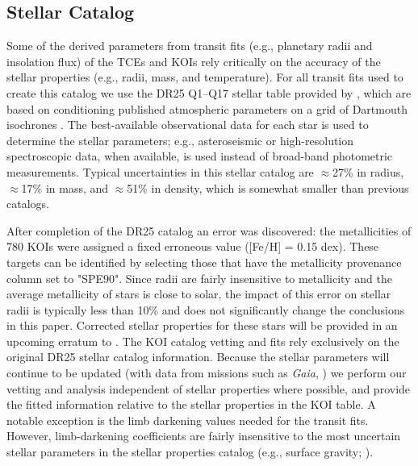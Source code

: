 \subsection{Stellar Catalog}
\label{s:stars}
Some of the derived parameters from transit fits (e.g., planetary radii and insolation flux) of the TCEs and KOIs rely critically on the accuracy of the stellar properties (e.g., radii, mass, and temperature). For all transit fits used to create this catalog we use the DR25 Q1--Q17 stellar table provided by \citet{Mathur2017ApJS}, which are based on conditioning published atmospheric parameters on a grid of Dartmouth isochrones \citep{Dotter2008}. The best-available observational data for each star is used to determine the stellar parameters; e.g., asteroseismic or high-resolution spectroscopic data, when available, is used instead of broad-band photometric measurements. Typical uncertainties in this stellar catalog are $\approx$27\% in radius, $\approx$17\% in mass, and $\approx$51\% in density, which is somewhat smaller than previous catalogs.

{\color{blue}After completion of the DR25 catalog an error was discovered: the metallicities of 780 KOIs were assigned a fixed erroneous value ([Fe/H] = 0.15 dex). These targets can be identified by selecting those that have the metallicity provenance column set to "SPE90". Since radii are fairly insensitive to metallicity and the average metallicity of \Kepler stars is close to solar, the impact of this error on stellar radii is typically less than 10\% and does not significantly change the conclusions in this paper. Corrected stellar properties for these stars will be provided in an upcoming erratum to \citet{Mathur2017ApJS}. The KOI catalog vetting and fits rely exclusively on the original DR25 stellar catalog information. Because the stellar parameters will continue to be updated (with data from missions such as \emph{Gaia}, \citealt{gaia1,gaia2}) we perform our vetting and analysis independent of stellar properties where possible, and provide the fitted information relative to the stellar properties in the KOI table.  A notable exception is the limb darkening values needed for the transit fits. However, limb-darkening coefficients are fairly insensitive to the most uncertain stellar parameters in the stellar properties catalog (e.g., surface gravity; \citealt{Claret2000}).
}